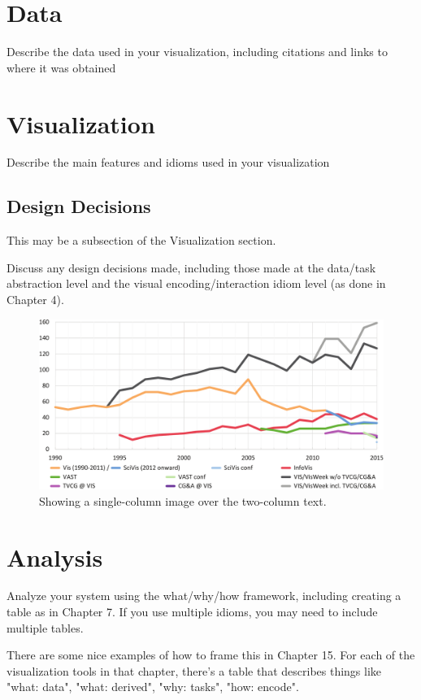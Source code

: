 \documentclass[journal]{vgtc}                %
\begin{document}
\section {Data}
Describe the data used in your visualization, including citations and links to where it was obtained

\section{Visualization}
Describe the main features and idioms used in your visualization

\subsection{Design Decisions}
This may be a subsection of the Visualization section.

Discuss any design decisions made, including those made at the data/task abstraction level and the visual encoding/interaction idiom level (as done in Chapter 4).

\begin{figure}
 \centering
 \includegraphics[width=0.8\linewidth]{paper-count-w-2015-new}
 \caption{Showing a single-column image over the two-column text.}
 \label{fig:sample-2}
\end{figure}

\section{Analysis}

Analyze your system using the what/why/how framework, including creating a table as in Chapter 7. If you use multiple idioms, you may need to include multiple tables.

There are some nice examples of how to frame this in Chapter 15.  For each of the visualization tools in that chapter, there's a table that describes things like "what: data", "what: derived", "why: tasks", "how: encode".
\end{document}
